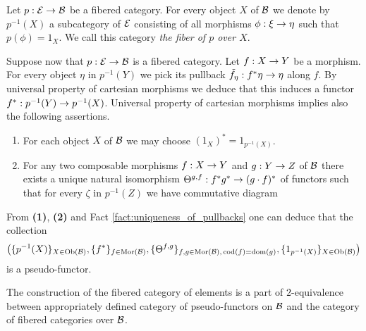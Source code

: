 \begin{definition}
Let $p:{\mathcal E}\rightarrow {\mathcal B}$ be a fibered category. For every object $X$ of ${\mathcal B}$ we denote by $p^{-1}(X)$ a subcategory of ${\mathcal E}$ consisting of all morphisms $\phi:\xi\rightarrow \eta$ such that $p(\phi) = 1_X$. We call this category \textit{the fiber of $p$ over $X$}.
\end{definition}
\noindent
Suppose now that $p:{\mathcal E}\rightarrow {\mathcal B}$ is a fibered category. Let $f:X\rightarrow Y$ be a morphism. For every object $\eta$ in $p^{-1}(Y)$ we pick its pullback $\tilde{f}_{\eta}:f^*\eta\rightarrow \eta$ along $f$. By universal property of cartesian morphisms we deduce that this induces a functor $f^*:p^{-1}(Y)\rightarrow p^{-1}(X)$. Universal property of cartesian morphisms implies also the following assertions.
\begin{enumerate}[label=\textbf{(\arabic*)}, leftmargin=3.0em]
\item For each object $X$ of ${\mathcal B}$ we may choose $(1_X)^* = 1_{p^{-1}(X)}$.
\item For any two composable morphisms $f:X\rightarrow Y$ and $g:Y\rightarrow Z$ of ${\mathcal B}$ there exists a unique natural isomorphism $\Theta^{g,f}: f^*g^* \rightarrow (g\cdot f)^*$ of functors such that for every $\zeta$ in $p^{-1}(Z)$ we have commutative diagram
\begin{center}
\end{center}
\end{enumerate}
From \textbf{(1)}, \textbf{(2)} and Fact \ref{fact:uniqueness_of_pullbacks} one can deduce that the collection
$$\big(\{p^{-1}(X)\}_{X\in \mathrm{Ob}({\mathcal B})},\{f^*\}_{f\in \mathrm{Mor}({\mathcal B})},\{\Theta^{f,g}\}_{f,g\in \mathrm{Mor}({\mathcal B}),\,\mathrm{cod}(f)=\mathrm{dom}(g)},\{1_{p^{-1}(X)}\}_{X\in \mathrm{Ob}({\mathcal B})}\big)$$
is a pseudo-functor.

\begin{remark}\label{remark:fibered_categories_and_pseudo_functors}
The construction of the fibered category of elements is a part of $2$-equivalence between appropriately defined category of pseudo-functors on ${\mathcal B}$ and the category of fibered categories over ${\mathcal B}$.
\end{remark}

